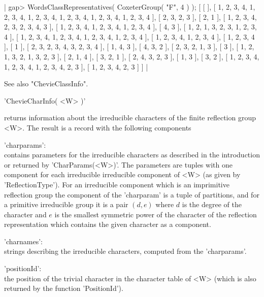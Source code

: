 |    gap> WordsClassRepresentatives( CoxeterGroup( "F", 4 ) );
    [ [  ],
      [ 1, 2, 3, 4, 1, 2, 3, 4, 1, 2, 3, 4, 1, 2, 3, 4, 1, 2, 3, 4, 1, 2,
          3, 4 ], [ 2, 3, 2, 3 ], [ 2, 1 ],                                    
      [ 1, 2, 3, 4, 2, 3, 2, 3, 4, 3 ],                                         
      [ 1, 2, 3, 4, 1, 2, 3, 4, 1, 2, 3, 4 ], [ 4, 3 ],                         
      [ 1, 2, 1, 3, 2, 3, 1, 2, 3, 4 ],                                          
      [ 1, 2, 3, 4, 1, 2, 3, 4, 1, 2, 3, 4, 1, 2, 3, 4 ],                       
      [ 1, 2, 3, 4, 1, 2, 3, 4 ], [ 1, 2, 3, 4 ], [ 1 ],                        
      [ 2, 3, 2, 3, 4, 3, 2, 3, 4 ], [ 1, 4, 3 ], [ 4, 3, 2 ],                  
      [ 2, 3, 2, 1, 3 ], [ 3 ], [ 1, 2, 1, 3, 2, 1, 3, 2, 3 ],                  
      [ 2, 1, 4 ], [ 3, 2, 1 ], [ 2, 4, 3, 2, 3 ], [ 1, 3 ], [ 3, 2 ],           
      [ 1, 2, 3, 4, 1, 2, 3, 4, 1, 2, 3, 4, 2, 3 ], [ 1, 2, 3, 4, 2, 3 ] ] |

See also "ChevieClassInfo".


'ChevieCharInfo( <W> )'

returns  information  about the  irreducible  characters  of the  finite
reflection group <W>.  The result is a record with the following
components\:\

'charparams':\\ contains parameters for the irreducible characters as
     described  in the  introduction or  returned by 'CharParams(<W>)'. The
     parameters   are  tuples  with  one  component  for  each  irreducible
     irreducible  component of <W>  (as given by  'ReflectionType'). For an
     irreducible  component which  is an  imprimitive reflection  group the
     component  of  the  'charparam'  is  a  tuple of partitions, and for a
     primitive  irreducible group  it is  a pair  $(d,e)$ where  $d$ is the
     degree of the character and $e$ is the smallest symmetric power of the
     character  of the  reflection representation  which contains the given
     character as a component.

'charnames':\\ strings describing the irreducible characters, computed from
     the 'charparams'.

'positionId':\\ the  position of the  trivial character  in the  character
     table  of <W>  (which is  also returned by the function 'PositionId').


